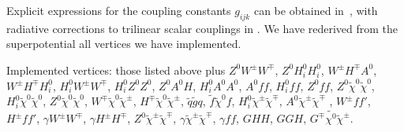 Explicit expressions for the coupling constants $g_{ijk}$ can be obtained
in~\cite{Haber:1984rc,Gunion:1984yn,Haber:1988px}, with radiative corrections to trilinear scalar couplings in
\cite{haber97}. We have rederived from the superpotential all vertices we have
implemented.

Implemented vertices:  those listed above plus 
$Z^0W^\pm W^\mp $, $Z^0H^0_iH^0_i$, $W^\pm H^\mp A^0$,
$W^\pm H^\mp H^0_i$, $H^0_iW^\pm W^\mp $, $H^0_iZ^0Z^0$, $Z^0A^0H$,
$H^0_iA^0A^0$, $A^0ff$, $H^0_iff$, $Z^0ff$, $Z^0\tilde{\chi}^0\tilde{\chi}^0$,
$H^0_i\tilde{\chi}^0\tilde{\chi}^0$, $Z^0\tilde{\chi}^0\tilde{\chi}^0$,
$W^\mp\tilde{\chi}^0\tilde{\chi}^\pm$, $H^\mp\tilde{\chi}^0\tilde{\chi}^\pm$, $
\tilde{q}\tilde{g}q$, $\tilde{f}\tilde{\chi}^0 f$, $H^0_i\tilde{\chi}^\pm
\tilde{\chi}^\mp$, $A^0\tilde{\chi}^\pm \tilde{\chi}^\mp$ , $W^\pm f f'$,
$H^\pm f f'$, $\gamma W^\pm W^\mp$, $ \gamma H^\pm H^\mp$, $Z^0
\tilde{\chi}^\pm \tilde{\chi}^\mp$, $\gamma\tilde{\chi}^\pm \tilde{\chi}^\mp$,
$\gamma f f$, $GHH$, $GGH$, $G^\mp\tilde{\chi^0}\tilde{\chi}^\pm$.


